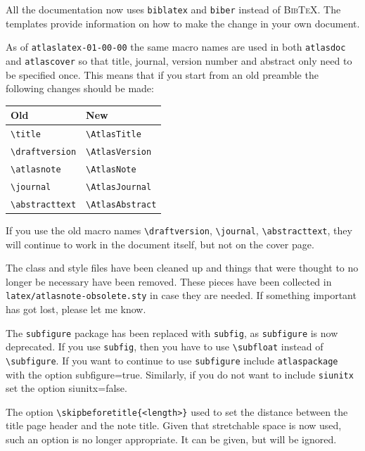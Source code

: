 \documentclass[atlasstyle,UKenglish]{latex/atlasdoc}
\newcommand{\BibTeX}{\textsc{Bib\TeX}}
\newcommand{\File}[1]{\texttt{#1}\xspace}
\newcommand{\Macro}[1]{\texttt{\textbackslash #1}\xspace}
\newcommand{\Option}[1]{\textsf{#1}\xspace}
\newcommand{\Package}[1]{\texttt{#1}\xspace}
\begin{document}
All the documentation now uses \texttt{biblatex} and \texttt{biber} instead of \BibTeX.
The templates provide information on how to make the change in your own document.

As of \File{atlaslatex-01-00-00} the same macro names are used in both \Package{atlasdoc} and
\Package{atlascover} so that title, journal, version number and abstract only need to be specified once.
This means that if you start from an old preamble the following changes should be made:
\begin{center}
  \begin{tabular}{ll}
    Old	& New\\
    \midrule
    \Macro{title} & \Macro{AtlasTitle}\\
    \Macro{draftversion} & \Macro{AtlasVersion}\\
    \Macro{atlasnote} & \Macro{AtlasNote}\\
    \Macro{journal} & \Macro{AtlasJournal}\\
    \Macro{abstracttext} & \Macro{AtlasAbstract}
  \end{tabular}
\end{center}
If you use the old macro names 
\Macro{draftversion}, \Macro{journal}, \Macro{abstracttext},
they will continue to work in the document itself, but not on the cover page.

The class and style files have been cleaned up and things 
that were thought to no longer be necessary have been removed.
These pieces have been collected in \texttt{latex/atlasnote-obsolete.sty} in case they are needed.
If something important has got lost, please let me know.

The \Package{subfigure} package has been replaced with \Package{subfig}, as \Package{subfigure} is now deprecated.
If you use \Package{subfig}, then you have to use \Macro{subfloat} instead of \Macro{subfigure}.
If you want to continue to use \Package{subfigure} include \Package{atlaspackage} with the option
\Option{subfigure=true}. Similarly, if you do not want to include \Package{siunitx} set
the option \Option{siunitx=false}.

The option \verb|\skipbeforetitle{<length>}| used to set the distance between
the title page header and the note title. 
Given that stretchable space is now used, such an option is no longer appropriate.
It can be given, but will be ignored.
\end{document}
